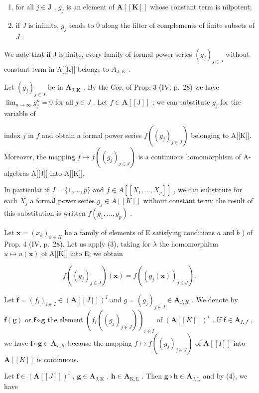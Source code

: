 \begin{enumerate}
\def\labelenumi{(\roman{enumi})}
\item
  for all \(j \in \mathbf{J}\) , \(g_j\) is an element of \(\mathbf{A}[[\mathbf{K}]]\) whose constant term is nilpotent;
\item
  if \(J\) is infinite, \(g_{j}\) tends to 0 along the filter of complements of finite subsets of \(J\) .
\end{enumerate}

We note that if J is finite, every family of formal power series \((g_{j})_{j\in J}\) without constant term in A{[}{[}K{]}{]} belongs to \(A_{J,K}\) .

Let \((g_j)_{j\in J}\) be in \(\mathbf{A}_{\mathrm{J},\mathbf{K}}\) . By the Cor. of Prop. 3 (IV, p.~28) we have \(\lim_{n\to \infty}g_j^n = 0\) for all \(j\in J\) . Let \(f\in \mathbf{A}[[\mathrm{J}]]\) ; we can substitute \(g_{j}\) for the variable of

index \(j\) in \(f\) and obtain a formal power series \(f((g_j)_{j \in J})\) belonging to A{[}{[}K{]}{]}. Moreover, the mapping \(f \mapsto f((g_j)_{j \in J})\) is a continuous homomorphism of A-algebras A{[}{[}J{]}{]} into A{[}{[}K{]}{]}.

In particular if \(J = \{1, \ldots, p\}\) and \(f \in A[[X_1, \ldots, X_p]]\) , we can substitute for each \(X_j\) a formal power series \(g_j \in A[[K]]\) without constant term; the result of this substitution is written \(f(g_1, \ldots, g_p)\) .

Let \(\mathbf{x} = (x_k)_{k\in K}\) be a family of elements of E satisfying conditions \(a\) and \(b\) ) of Prop. 4 (IV, p.~28). Let us apply (3), taking for \(\lambda\) the homomorphism \(u\mapsto u(\mathbf{x})\) of A{[}{[}K{]}{]} into E; we obtain

\[
f \left(\left(g _ {j}\right) _ {j \in J}\right) (\mathbf {x}) = f \left(\left(g _ {j} (\mathbf {x})\right) _ {j \in J}\right).\tag{4}
\]

Let \(\mathbf{f} = (f_i)_{i\in I}\in (\mathbf{A}[[J]])^I\) and \(g = (g_j)_{j\in J}\in \mathbf{A}_{J,K}\) . We denote by \(\mathbf{f}(\mathbf{g})\) or \(\mathbf{f}\circ \mathbf{g}\) the element \((f_{i}((g_{j})_{j\in J}))_{i\in I}\) of \((\mathbf{A}[[K]])^I\) . If \(\mathbf{f}\in \mathbf{A}_{I,J}\) , we have \(\mathbf{f}\circ \mathbf{g}\in \mathbf{A}_{I,K}\) because the mapping \(f\mapsto f((g_j)_{j\in J})\) of \(\mathbf{A}[[I]]\) into \(\mathbf{A}[[K]]\) is continuous.

Let \(\mathbf{f} \in (\mathbf{A}[[J]])^{\mathrm{I}}\) , \(\mathbf{g} \in \mathbf{A}_{\mathrm{J},\mathrm{K}}\) , \(\mathbf{h} \in \mathbf{A}_{\mathrm{K},\mathrm{L}}\) . Then \(\mathbf{g} \circ \mathbf{h} \in \mathbf{A}_{\mathrm{J},\mathrm{L}}\) and by (4), we have


